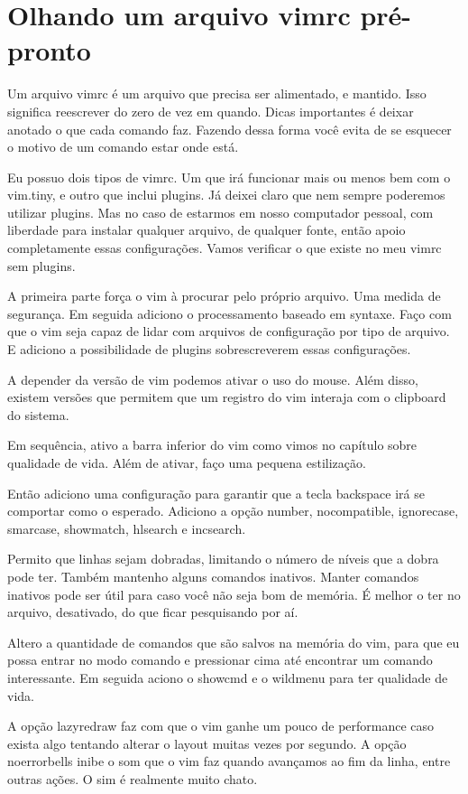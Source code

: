 \section{Olhando um arquivo vimrc pré-pronto}
Um arquivo vimrc é um arquivo que precisa ser alimentado, e mantido.
Isso significa reescrever do zero de vez em quando.
Dicas importantes é deixar anotado o que cada comando faz.
Fazendo dessa forma você evita de se esquecer o motivo de um comando estar onde está.

Eu possuo dois tipos de vimrc.
Um que irá funcionar mais ou menos bem com o vim.tiny, e outro que inclui plugins.
Já deixei claro que nem sempre poderemos utilizar plugins.
Mas no caso de estarmos em nosso computador pessoal, com liberdade para instalar qualquer arquivo,
de qualquer fonte, então apoio completamente essas configurações.
Vamos verificar o que existe no meu vimrc sem plugins.

A primeira parte força o vim à procurar pelo próprio arquivo.
Uma medida de segurança.
Em seguida adiciono o processamento baseado em syntaxe.
Faço com que o vim seja capaz de lidar com arquivos de configuração por tipo de arquivo.
E adiciono a possibilidade de plugins sobrescreverem essas configurações.

A depender da versão de vim podemos ativar o uso do mouse.
Além disso, existem versões que permitem que um registro do vim interaja com o clipboard do sistema.

Em sequência, ativo a barra inferior do vim como vimos no capítulo sobre qualidade de vida.
Além de ativar, faço uma pequena estilização.

Então adiciono uma configuração para garantir que a tecla backspace irá se comportar como o esperado.
Adiciono a opção number, nocompatible, ignorecase, smarcase, showmatch, hlsearch e incsearch.

Permito que linhas sejam dobradas, limitando o número de níveis que a dobra pode ter.
Também mantenho alguns comandos inativos.
Manter comandos inativos pode ser útil para caso você não seja bom de memória.
É melhor o ter no arquivo, desativado, do que ficar pesquisando por aí.

Altero a quantidade de comandos que são salvos na memória do vim, para que eu possa entrar no modo comando e pressionar cima até encontrar um comando interessante.
Em seguida aciono o showcmd e o wildmenu para ter qualidade de vida.

A opção lazyredraw faz com que o vim ganhe um pouco de performance caso exista algo tentando alterar o layout muitas vezes por segundo.
A opção noerrorbells inibe o som que o vim faz quando avançamos ao fim da linha, entre outras ações.
O sim é realmente muito chato.

